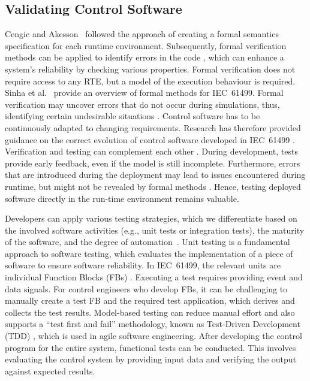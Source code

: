 \subsection{Validating Control Software}
Cengic and Akesson~\cite{cengic_executionsemantics} followed the approach of creating a formal semantics specification for each runtime environment. Subsequently, formal verification methods can be applied to identify errors in the code \cite{xavier2024framework}, which can enhance a system's reliability by checking various properties. Formal verification does not require access to any RTE, but a model of the execution behaviour is required. Sinha et al.~\cite{Sinha.2019} provide an overview of formal methods for IEC~61499. Formal verification may uncover errors that do not occur during simulations, thus, identifying certain undesirable situations \cite{lilli2023formal}. 
Control software has to be continuously adapted to changing requirements. Research has therefore provided guidance on the correct evolution of control software developed in IEC~61499 \cite{faqrizal_guidedevolution}. 
Verification and testing can complement each other \cite{Hussain.2006}. During development, tests provide early feedback, even if the model is still incomplete. Furthermore, errors that are introduced during the deployment may lead to issues encountered during runtime, but might not be revealed by formal methods \cite{ovsiannikova2023formal} \cite{xavier2023formal}. Hence, testing deployed software directly in the run-time environment remains valuable.

Developers can apply various testing strategies, which we differentiate based on the involved software activities (e.g., unit tests or integration tests), the maturity of the software, and the degree of automation~\cite{softwareTesting}. 
Unit testing is a fundamental approach to software testing, which evaluates the implementation of a piece of software \cite{softwareTesting} to ensure software reliability.
In IEC~61499, the relevant units are individual Function Blocks (FBs) \cite{hametner2014}. Executing a test requires providing event and data signals. For control engineers who develop FBs, it can be challenging to manually create a test FB and the required test application, which derives and collects the test results. Model-based testing can reduce manual effort and also supports a ``test first and fail'' methodology, known as Test-Driven Development (TDD) \cite{hametner2014}, which is used in agile software engineering.  
After developing the control program for the entire system, functional tests can be conducted. This involves evaluating the control system by providing input data and verifying the output against expected results.

